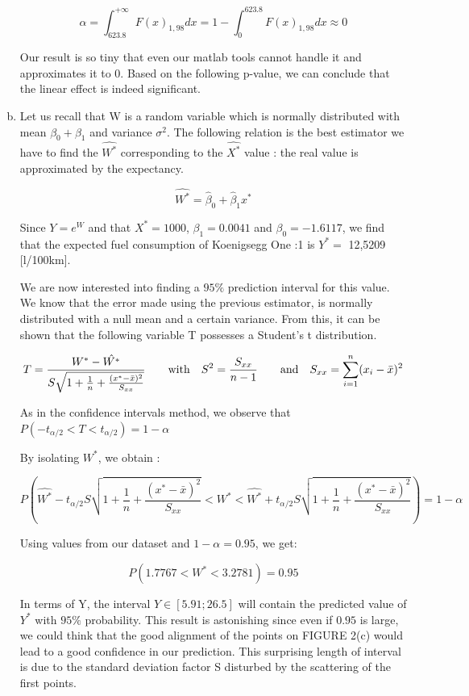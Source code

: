 \documentclass[a4paper]{article}
\begin{document}
\begin{enumerate}[(a)]
$$\alpha = \int_{623.8}^{+\infty} F(x)_{1,98} dx  = 1- \int_0^{623.8} F(x)_{1,98} dx \approx 0$$

Our result is so tiny that even our matlab tools cannot handle it and approximates it to 0. Based on the following p-value, we can conclude that the linear effect is indeed significant.

\item Let us recall that W is a random variable which is normally distributed with mean $\beta_0 + \beta_1$ and variance $\sigma^2$. The following relation is the best estimator we have to find the $\hat{W^*}$ corresponding to the $\hat{X^*}$ value : the real value is approximated by the expectancy.

$$\hat{W^*} = \hat{\beta}_0 + \hat{\beta}_1 x^*$$

Since $Y = e^{W}$ and that $X^*=1000$, $\beta_1=0.0041$ and $\beta_0=-1.6117$, we find that the expected fuel consumption of Koenigsegg One :1 is $Y^*=$ 12,5209 [l/100km].

We are now interested into finding a $95\%$ prediction interval for this value. We know that the error made using the previous estimator, is normally distributed with a null mean and a certain variance. From this, it can be shown that the following variable T possesses a Student's t distribution.

$$T = \frac{W^*-\hat{W^*}}{S\sqrt{1+\frac{1}{n}+\frac{(x^*-\bar{x})^2}{S_{xx}}}} \qquad \textup{with} \quad S^2= \frac{S_{xx}}{n-1} \qquad \textup{and} \quad S_{xx} = \sum_{i=1}^n (x_i-\bar{x})^2  $$

As in the confidence intervals method, we observe that $P(-t_{\alpha /2} < T < t_{\alpha /2}) = 1-\alpha$

By isolating $W^*$, we obtain :

$$P\left ( \hat{W^*}-t_{\alpha/2}S\sqrt{1+\frac{1}{n}+\frac{(x^*-\bar{x})^2}{S_{xx}}} < W^* < \hat{W^*}+t_{\alpha/2}S\sqrt{1+\frac{1}{n}+\frac{(x^*-\bar{x})^2}{S_{xx}}} \right ) = 1-\alpha$$

Using values from our dataset and $1-\alpha = 0.95$, we get:

$$P\left (1.7767 < W^* < 3.2781 \right ) = 0.95$$

In terms of Y, the interval $Y \in \left [ 5.91;26.5 \right ]$ will contain the predicted value of $Y^*$ with $95\%$ probability. This result is astonishing since even if $0.95$ is large, we could think that the good alignment of the points on FIGURE 2(c) would lead to a good confidence in our prediction. This surprising length  of interval is due to the standard deviation factor S disturbed by the scattering of the first points.


\end{enumerate}
\end{document}
